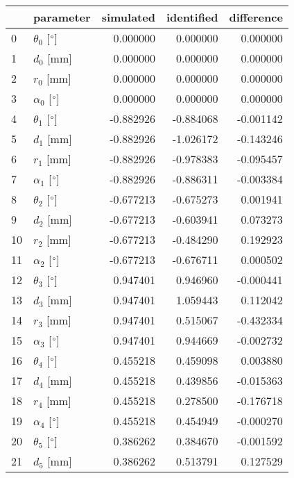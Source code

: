 \documentclass{standalone}%
\begin{document}
%
\normalsize%
\begin{tabular}{llrrr}
\toprule
{} &                 parameter & simulated & identified & difference \\
\midrule
0  &  $\theta_{0}$ [$\degree$] &  0.000000 &   0.000000 &   0.000000 \\
1  &              $d_{0}$ [mm] &  0.000000 &   0.000000 &   0.000000 \\
2  &              $r_{0}$ [mm] &  0.000000 &   0.000000 &   0.000000 \\
3  &  $\alpha_{0}$ [$\degree$] &  0.000000 &   0.000000 &   0.000000 \\
4  &  $\theta_{1}$ [$\degree$] & -0.882926 &  -0.884068 &  -0.001142 \\
5  &              $d_{1}$ [mm] & -0.882926 &  -1.026172 &  -0.143246 \\
6  &              $r_{1}$ [mm] & -0.882926 &  -0.978383 &  -0.095457 \\
7  &  $\alpha_{1}$ [$\degree$] & -0.882926 &  -0.886311 &  -0.003384 \\
8  &  $\theta_{2}$ [$\degree$] & -0.677213 &  -0.675273 &   0.001941 \\
9  &              $d_{2}$ [mm] & -0.677213 &  -0.603941 &   0.073273 \\
10 &              $r_{2}$ [mm] & -0.677213 &  -0.484290 &   0.192923 \\
11 &  $\alpha_{2}$ [$\degree$] & -0.677213 &  -0.676711 &   0.000502 \\
12 &  $\theta_{3}$ [$\degree$] &  0.947401 &   0.946960 &  -0.000441 \\
13 &              $d_{3}$ [mm] &  0.947401 &   1.059443 &   0.112042 \\
14 &              $r_{3}$ [mm] &  0.947401 &   0.515067 &  -0.432334 \\
15 &  $\alpha_{3}$ [$\degree$] &  0.947401 &   0.944669 &  -0.002732 \\
16 &  $\theta_{4}$ [$\degree$] &  0.455218 &   0.459098 &   0.003880 \\
17 &              $d_{4}$ [mm] &  0.455218 &   0.439856 &  -0.015363 \\
18 &              $r_{4}$ [mm] &  0.455218 &   0.278500 &  -0.176718 \\
19 &  $\alpha_{4}$ [$\degree$] &  0.455218 &   0.454949 &  -0.000270 \\
20 &  $\theta_{5}$ [$\degree$] &  0.386262 &   0.384670 &  -0.001592 \\
21 &              $d_{5}$ [mm] &  0.386262 &   0.513791 &   0.127529 \\

\end{tabular}
\end{document}
